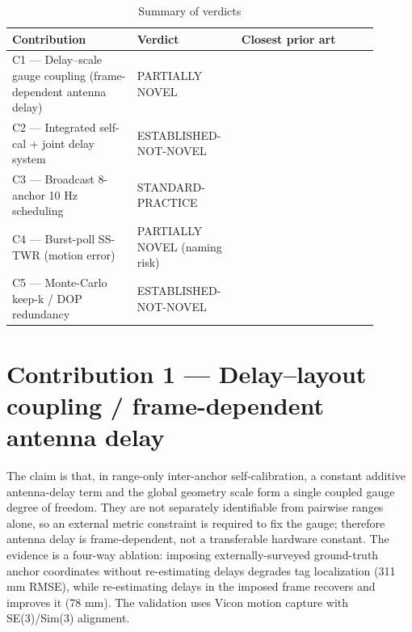 \begin{table}[htbp]
\centering
\caption{Summary of verdicts}
\renewcommand{\arraystretch}{1.15}
\begin{tabular}{@{}p{0.31\linewidth}p{0.25\linewidth}p{0.34\linewidth}@{}}
\toprule
\textbf{Contribution} & \textbf{Verdict} & \textbf{Closest prior art} \\
\midrule
C1 --- Delay--scale gauge coupling (frame-dependent antenna delay) & PARTIALLY NOVEL & \cite{lichti2010propagation,kuang2013stratified,batstone2019robust} \\
C2 --- Integrated self-cal + joint delay system & ESTABLISHED-NOT-NOVEL & \cite{piavanini2022calibration,hamer2018selfcalibrating,lutz2019visual} \\
C3 --- Broadcast 8-anchor 10 Hz scheduling & STANDARD-PRACTICE & \cite{grosswindhager2019snaploc} \\
C4 --- Burst-poll SS-TWR (motion error) & PARTIALLY NOVEL (naming risk) & \cite{sidorenko2020error,dotlic2018ranging,neirynck2016alternative} \\
C5 --- Monte-Carlo keep-k / DOP redundancy & ESTABLISHED-NOT-NOVEL & \cite{albaidhani2021anchor,albaidhani2019anchor} \\
\bottomrule
\end{tabular}
\end{table}

\section{Contribution 1 --- Delay--layout coupling / frame-dependent antenna delay}


The claim is that, in range-only inter-anchor self-calibration, a constant additive antenna-delay term and the global geometry scale form a single coupled gauge degree of freedom. They are not separately identifiable from pairwise ranges alone, so an external metric constraint is required to fix the gauge; therefore antenna delay is frame-dependent, not a transferable hardware constant. The evidence is a four-way ablation: imposing externally-surveyed ground-truth anchor coordinates without re-estimating delays degrades tag localization (311 mm RMSE), while re-estimating delays in the imposed frame recovers and improves it (78 mm). The validation uses Vicon motion capture with SE(3)/Sim(3) alignment.

